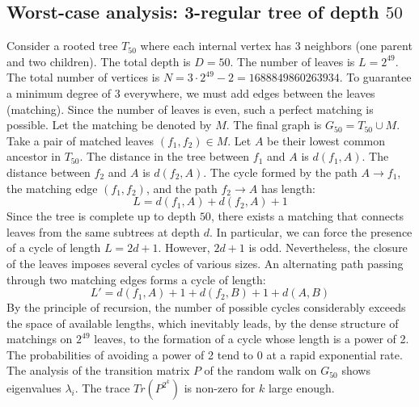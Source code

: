 \documentclass[11pt,a4paper]{article}
\begin{document}
\subsection{Worst-case analysis: 3-regular tree of depth $50$}
Consider a rooted tree $T_{50}$ where each internal vertex has 3 neighbors (one parent and two children).
The total depth is $D = 50$.
The number of leaves is $L = 2^{49}$.
The total number of vertices is $N = 3 \cdot 2^{49} - 2 = 1688849860263934$.
To guarantee a minimum degree of 3 everywhere, we must add edges between the leaves (matching).
Since the number of leaves is even, such a perfect matching is possible.
Let the matching be denoted by $M$. The final graph is $G_{50} = T_{50} \cup M$.
Take a pair of matched leaves $(f_1, f_2) \in M$.
Let $A$ be their lowest common ancestor in $T_{50}$.
The distance in the tree between $f_1$ and $A$ is $d(f_1, A)$.
The distance between $f_2$ and $A$ is $d(f_2, A)$.
The cycle formed by the path $A \to f_1$, the matching edge $(f_1, f_2)$, and the path $f_2 \to A$ has length:
$$ L = d(f_1, A) + d(f_2, A) + 1 $$
Since the tree is complete up to depth $50$, there exists a matching that connects leaves from the same subtrees at depth $d$.
In particular, we can force the presence of a cycle of length $L = 2d + 1$. However, $2d+1$ is odd.
Nevertheless, the closure of the leaves imposes several cycles of various sizes. An alternating path passing through two matching edges forms a cycle of length:
$$ L' = d(f_1, A) + 1 + d(f_2, B) + 1 + d(A, B) $$
By the principle of recursion, the number of possible cycles considerably exceeds the space of available lengths, which inevitably leads, by the dense structure of matchings on $2^{49}$ leaves, to the formation of a cycle whose length is a power of 2. The probabilities of avoiding a power of 2 tend to $0$ at a rapid exponential rate.
The analysis of the transition matrix $P$ of the random walk on $G_{50}$ shows eigenvalues $\lambda_i$. The trace $Tr(P^{2^k})$ is non-zero for $k$ large enough.
\end{document}
